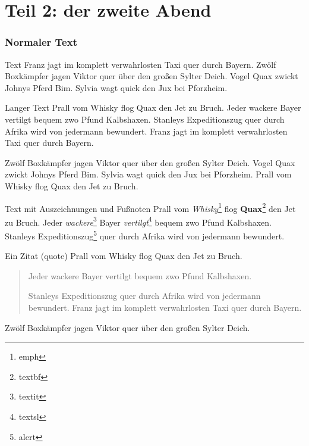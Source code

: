 \documentclass[t, aspectratio=169, ngerman]{beamer}
\begin{document}
	\part{Teil 2: der zweite Abend}

	\frame{\partpage}

	\section{Normaler Text}

	\begin{frame}{Text}
		Franz jagt im komplett verwahrlosten Taxi quer durch Bayern.
		Zwölf Boxkämpfer jagen Viktor quer über den großen Sylter Deich.
		Vogel Quax zwickt Johnys Pferd Bim.
		Sylvia wagt quick den Jux bei Pforzheim.
	\end{frame}

	\begin{frame}{Langer Text}
		Prall vom Whisky flog Quax den Jet zu Bruch.
		Jeder wackere Bayer vertilgt bequem zwo Pfund Kalbshaxen.
		Stanleys Expeditionszug quer durch Afrika wird von jedermann bewundert.
		Franz jagt im komplett verwahrlosten Taxi quer durch Bayern.

		Zwölf Boxkämpfer jagen Viktor quer über den großen Sylter Deich.
		Vogel Quax zwickt Johnys Pferd Bim.
		Sylvia wagt quick den Jux bei Pforzheim.
		Prall vom Whisky flog Quax den Jet zu Bruch.
	\end{frame}

	\begin{frame}{Text mit Auszeichnungen und Fußnoten}
		Prall vom \emph{Whisky}\footnote{emph} flog \textbf{Quax}\footnote{textbf} den Jet zu Bruch.
		Jeder \textit{wackere}\footnote{textit} Bayer \textsl{vertilgt}\footnote{textsl} bequem zwo Pfund Kalbshaxen.
		Stanleys \alert{Expeditionszug}\footnote{alert} quer durch Afrika wird von jedermann bewundert.
	\end{frame}

	\begin{frame}{Ein Zitat (quote)}
		Prall vom Whisky flog Quax den Jet zu Bruch.

		\begin{quote}
			Jeder wackere Bayer vertilgt bequem zwo Pfund Kalbshaxen.

			Stanleys Expeditionszug quer durch Afrika wird von jedermann bewundert.
			Franz jagt im komplett verwahrlosten Taxi quer durch Bayern.
		\end{quote}

		Zwölf Boxkämpfer jagen Viktor quer über den großen Sylter Deich.
	\end{frame}
\end{document}
